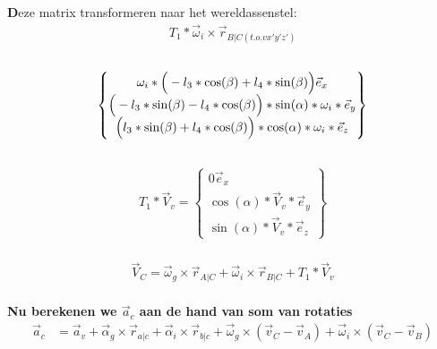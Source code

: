 \documentclass[a4paper,10pt]{article}
\begin{document}
\textbf Deze matrix transformeren naar het wereldassenstel:\
\begin{equation}
	\begin{aligned}
		{T}_{1}* \vec{\omega}_i \times \vec{r}_{B|C(t.o.v x'y'z')}
	\end{aligned}
\end{equation}\\
\begin{equation}
	\begin{Bmatrix}
		{\omega_i*\Big( -l_3*\cos(\beta) + l_4 *\sin(\beta)\Big)\vec{e}_{x}}\\
		\Big(-l_3 * \sin(\beta)- l_4 * \cos(\beta)\Big)*\sin(\alpha) *\omega_i *\vec{e}_{y}\\
		\Big{(l_3 * \sin(\beta) + l_4 * \cos(\beta)\Big)*\cos(\alpha) *\omega_i*\vec{e}_{z}}
	\end{Bmatrix}
\end{equation}\\
\begin{equation}
	\begin{aligned}
		{T}_{1}* \vec{V}_v = \begin{Bmatrix}
			{0\vec{e}_{x}}\\
			\cos(\alpha)*\vec{V}_v*\vec{e}_{y}\\
			\sin(\alpha)*\vec{V}_v*\vec{e}_{z}
		\end{Bmatrix}
	\end{aligned}
\end{equation}\\
\begin{equation}
	\begin{aligned}
		\vec{V}_{C}=  \vec{\omega}_g \times \vec{r}_{A|C} + \vec{\omega}_i \times \vec{r}_{B|C} +{T}_{1}* \vec{V}_v
	\end{aligned}
\end{equation}\\
\textbf{Nu berekenen we $\vec{a}_c$ aan de hand van som van rotaties} 
\begin{equation}
	\begin{aligned}
		\vec{a}_c &= \vec{a}_v + \vec{\alpha}_g  \times \vec{r}_{a|c} + \vec{\alpha}_i \times \vec{r}_{b|c} + \vec{\omega}_g \times ( \vec{v}_{C} - \vec{v}_{A}) + \vec{\omega}_i \times ( \vec{v}_{C} - \vec{v}_{B})\\
	\end{aligned}
\end{equation}
\end{document}
